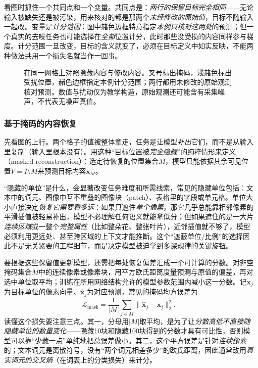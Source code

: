 看图时抓住一个共同点和一个变量。共同点是：\emph{两行的保留目标完全相同}——无论输入被缺失还是被污染，用来核对的都是那两个\emph{未经修改的原始值}，目标不随输入一起改。变量是\emph{计分范围}：图中赭色边框特意指定\emph{本例只核对这两处}的预测；但一个真实的去噪任务也可能选择在\emph{全部}位置计分，此时那些没受损的内容同样参与梯度。计分范围一旦改变，目标的含义就变了，必须在目标定义中如实反映，不能两种做法共用一个损失名就当作一回事。

\begin{figure}[htbp]
  \centering
  
  \caption{在同一网格上对照隐藏内容与修改内容。叉号标出掩码，浅赭色标出受扰位置，赭色边框指定本例计分范围；两行都用未修改的原始观测核对预测。数值与扰动仅为教学构造，原始观测还可能含有采集噪声，不代表无噪声真值。}
  \label{fig:data-derived-knowledge-masking-denoising}
\end{figure}
\FloatBarrier

\subsubsection{基于掩码的内容恢复}
\label{sec:data-derived-knowledge-masked-recovery}

先看图的上行。两个格子的值被整体拿走，任务是让模型\emph{补出}它们，而不是从输入里复制（输入里根本没有）。用这种“目标位置被\emph{完全隐藏}”的纯粹情形来定义（masked reconstruction）：选定待恢复的位置集合$M$，模型只能依据其余可见位置$V=I\setminus M$来预测目标内容$\bm{x}_M$。

“隐藏的单位”是什么，会显著改变任务难度和所需线索，常见的隐藏单位包括：文本中的词元、图像中互不重叠的图像块（patch）、表格里的字段或单元格。单位大小直接决定\emph{恢复它需要看多远}：如果只遮住\emph{单个像素}，那它几乎总能靠相邻像素的平滑插值被轻易补出，模型不必理解任何语义就能拿低分；但如果遮住的是一大片\emph{连续区域}或一整个\emph{完整属性}（比如整朵花、整张叶片），近邻插值就不够了，模型必须利用更远处、甚至跨区域的上下文才能推断。这个“遮蔽单位/比例”的选择因此不是无关紧要的工程细节，而是决定模型被迫学到多深规律的关键旋钮。

要根据这些保留值更新模型，还需把每处恢复偏差汇成一个可计算的分数。对非空掩码集合$M$中的连续像素或像素块，用平方欧氏距离度量预测与原值的偏差，再对选中单位取平均；训练在所用网络结构允许的模型参数范围内减小这一分数。记$\bm{x}_j$为目标单位的像素向量、$\widehat{\bm{x}}_j$为对应预测，常见的掩码均方误差为
\begin{equation}
  \mathcal{L}_{\mathrm{mask}}
  =\frac{1}{|M|}\sum_{j\in M}\lVert \widehat{\bm{x}}_j-\bm{x}_j\rVert_2^2.
  \label{eq:data-derived-knowledge-masked-reconstruction}
\end{equation}
读懂这个损失要注意三点。其一，分母用$|M|$取平均，是为了让\emph{分数高低不直接随隐藏单位的数量变化}——隐藏10块和隐藏100块得到的分数才具有可比性，否则模型可以靠“少藏一点”单纯地把总误差做小。其二，这个平方误差是针对\emph{连续像素}的；文本词元是离散符号，没有“两个词元相差多少”的欧氏距离，因此通常改用\emph{真实词元的交叉熵}（在词表上的分类损失）来计分。

